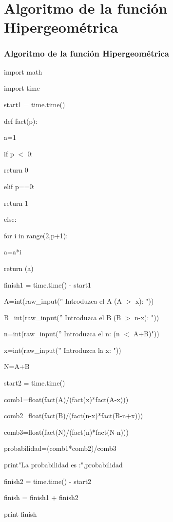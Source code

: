 \documentclass[10pt]{beamer}
\begin{document}

\section{Algoritmo de la función Hipergeométrica}
\begin{frame}
\frametitle{Algoritmo de la función Hipergeométrica}

{\tiny import math 

import time 

start1 = time.time() 


def fact(p):

\hspace{4mm} a=1
    
\hspace{4mm} if p $<$ 0:
        
\hspace{7mm} return 0
    
\hspace{4mm} elif p==0:
        
\hspace{7mm} return 1
    
\hspace{4mm} else:
        
\hspace{7mm} for i in range(2,p+1):
            
\hspace{10mm} a=a*i
    
\hspace{4mm} return (a)


finish1 = time.time() - start1     
        
A=int(raw\_input('' Introduzca el A (A $>$ x): "))

B=int(raw\_input('' Introduzca el B (B $>$ n-x): "))

n=int(raw\_input('' Introduzca el n: (n $<$ A+B)"))

x=int(raw\_input('' Introduzca la x: "))


N=A+B


start2 = time.time()

comb1=float(fact(A)/(fact(x)*fact(A-x)))

comb2=float(fact(B)/(fact(n-x)*fact(B-n+x)))

comb3=float(fact(N)/(fact(n)*fact(N-n)))

probabilidad=(comb1*comb2)/comb3

print"La probabilidad es :",probabilidad

finish2 = time.time() - start2

finish = finish1 + finish2

print finish}

\end{frame}
\end{document}
